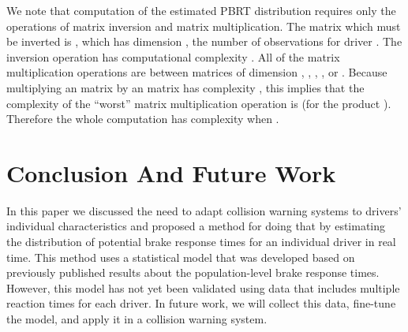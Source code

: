 \documentclass[conference]{IEEEtran}
\begin{document}
We note that computation of the estimated PBRT distribution requires only the operations of matrix inversion and matrix multiplication.  The matrix which must be inverted is , which has dimension , the number of observations for driver .  The inversion operation has computational complexity .  All of the matrix multiplication operations are between matrices of dimension , , , , or .  Because multiplying an  matrix by an  matrix has complexity , this implies that the complexity of the ``worst'' matrix multiplication operation is  (for the product ).  Therefore the whole computation has complexity  when .
\section{Conclusion And Future Work} \label{conc}
In this paper we discussed the need to adapt collision warning systems
to drivers' individual characteristics and proposed a method for doing that
by estimating the distribution of potential brake response times for an
individual driver in real time.  This method uses a statistical model that
was developed based on previously published results about the
population-level brake response times.  However, this model has not yet
been validated using data that includes multiple reaction times for each
driver.  In future work, we will collect this data, fine-tune the model,
and apply it in a collision warning system.
\end{document}
